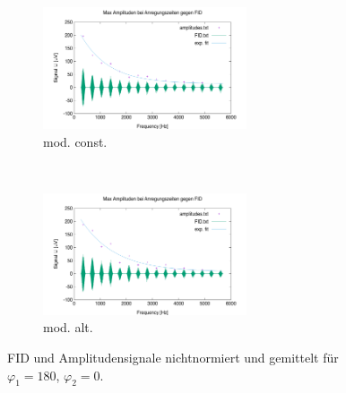 \documentclass[../../main.tex]{subfiles}
\begin{document}
        \begin{figure}[H]
            \centering
            \begin{subfigure}[b]{0.4\textwidth}
                \centering
                \includegraphics[width=6cm]{Bilddateien/10/CPMG-180-0-constant-avg.png}
                \caption{mod. const.}
                \label{fig:CPMG-180-0-constant-avg}
            \end{subfigure}
            \
            \begin{subfigure}[b]{0.4\textwidth}
                \centering
                \includegraphics[width=6cm]{Bilddateien/10/CPMG-180-0-alternating-avg.png}
                \caption{mod. alt.}
                \label{fig:CPMG-180-0-alternating-avg}
            \end{subfigure}
            \caption{FID und Amplitudensignale nichtnormiert und gemittelt für $\varphi_1 = 180$, $\varphi_2 = 0$.}
            \label{fig:CPMG-180-0-avg}
        \end{figure}
\end{document}
